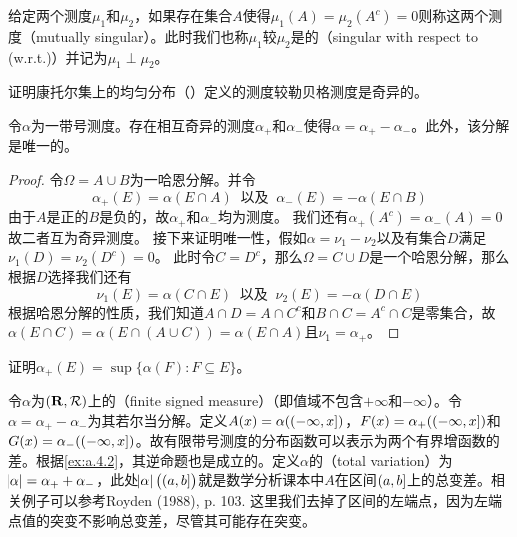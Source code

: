 \documentclass[main.tex]{subfiles}
\begin{document}
给定两个测度\(\mu_1\)和\(\mu_2\)，如果存在集合\(A\)使得\(\mu_1(A)=\mu_2(A^c)=0\)则称这两个测度（mutually singular）。此时我们也称\(\mu_1\)较\(\mu_2\)是的（singular with respect to (w.r.t.)）并记为\(\mu_1\perp\mu_2\)。
\begin{exercise}[start=2]
	\item 证明康托尔集上的均匀分布（）定义的测度较勒贝格测度是奇异的。
\end{exercise}


\begin{theorem}
	\label{thm:a.4.6}
	令\(\alpha\)为一带号测度。存在相互奇异的测度\(\alpha_+\)和\(\alpha_-\)使得\(\alpha=\alpha_+-\alpha_-\)。此外，该分解是唯一的。
\end{theorem}
\begin{proof}
	令\(\Omega = A\cup B\)为一哈恩分解。并令
	\[\alpha_+(E) = \alpha(E\cap A)\ \text{ 以及 }\ \alpha_-(E) = -\alpha(E\cap B)\]
	由于\(A\)是正的\(B\)是负的，故\(\alpha_+\)和\(\alpha_-\)均为测度。
	我们还有\(\alpha_+(A^c)=\alpha_-(A)=0\)故二者互为奇异测度。
	接下来证明唯一性，假如\(\alpha=\nu_1-\nu_2\)以及有集合\(D\)满足\(\nu_1(D)=\nu_2(D^c)=0\)。
	此时令\(C=D^c\)，那么\(\Omega=C\cup D\)是一个哈恩分解，那么根据\(D\)选择我们还有
	\[\nu_1(E) = \alpha(C\cap E)\ \text{ 以及 }\ \nu_2(E)=-\alpha(D\cap E)\]
	根据哈恩分解的性质，我们知道\(A\cap D = A\cap C^c\)和\(B\cap C=A^c\cap C\)是零集合，故\(\alpha(E\cap C) = \alpha(E\cap(A\cup C)) = \alpha(E\cap A)\)且\(\nu_1=\alpha_+\)。
\end{proof}
\begin{exercise}[start=3]
	\item 证明\(\alpha_+(E)=\sup\{\alpha(F):F\subseteq E\}\)。
\end{exercise}
\begin{remark}
	令\(\alpha\)为\((\mathbf{R}, \mathcal{R})\)上的（finite signed measure）（即值域不包含\(+\infty\)和\(-\infty\)）。令\(\alpha=\alpha_+-\alpha_-\)为其若尔当分解。定义\(A(x) = \alpha(\intoc{-\infty,x})\)，\(F(x) = \alpha_+(\intoc{-\infty,x})\)和\(G(x) = \alpha_-(\intoc{-\infty,x})\)。故有限带号测度的分布函数可以表示为两个有界增函数的差。根据\ref{ex:a.4.2}，其逆命题也是成立的。定义\(\alpha\)的（total variation）为\(\envert{\alpha} = \alpha_++\alpha_-\)，此处\(\envert{\alpha}\del{\intoc{a, b}}\)就是数学分析课本中\(A\)在区间\(\intoc{a,b}\)上的总变差。相关例子可以参考Royden (1988), p. 103.
	这里我们去掉了区间的左端点，因为左端点值的突变不影响总变差，尽管其可能存在突变。
\end{remark}
\end{document}
